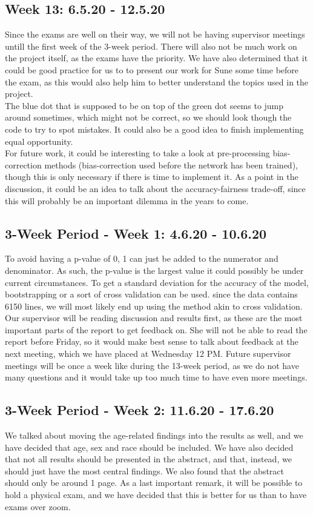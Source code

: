 \documentclass[11pt, fleqn]{article}
\begin{document}
\subsection*{Week 13: 6.5.20 - 12.5.20}
Since the exams are well on their way, we will not be having supervisor meetings untill the first week of the 3-week period. There will also not be much work on the project itself, as the exams have the priority. We have also determined that it could be good practice for us to to present our work for Sune some time before the exam, as this would also help him to better understand the topics used in the project. \\
The blue dot that is supposed to be on top of the green dot seems to jump around sometimes, which might not be correct, so we should look though the code to try to spot mistakes. It could also be a good idea to finish implementing equal opportunity. \\
For future work, it could be interesting to take a look at pre-processing bias-correction methods (bias-correction used before the network has been trained), though this is only necessary if there is time to implement it. As a point in the discussion, it could be an idea to talk about the accuracy-fairness trade-off, since this will probably be an important dilemma in the years to come.

\subsection*{3-Week Period - Week 1: 4.6.20 - 10.6.20}
To avoid having a p-value of 0, 1 can just be added to the numerator and denominator. As such, the p-value is the largest value it could possibly be under current circumstances. To get a standard deviation for the accuracy of the model, bootstrapping or a sort of cross validation can be used. since the data contains 6150 lines, we will most likely end up using the method akin to cross validation.
Our supervisor will be reading discussion and results first, as these are the most important parts of the report to get feedback on. She will not be able to read the report before Friday, so it would make best sense to talk about feedback at the next meeting, which we have placed at Wednesday 12 PM.
Future supervisor meetings will be once a week like during the 13-week period, as we do not have many questions and it would take up too much time to have even more meetings.

\subsection*{3-Week Period - Week 2: 11.6.20 - 17.6.20}
We talked about moving the age-related findings into the results as well, and we have decided that age, sex and race should be included. We have also decided that not all results should be presented in the abstract, and that, instead, we should just have the most central findings. We also found that the abstract should only be around 1 page. As a last important remark, it will be possible to hold a physical exam, and we have decided that this is better for us than to have exams over zoom.
\end{document}
